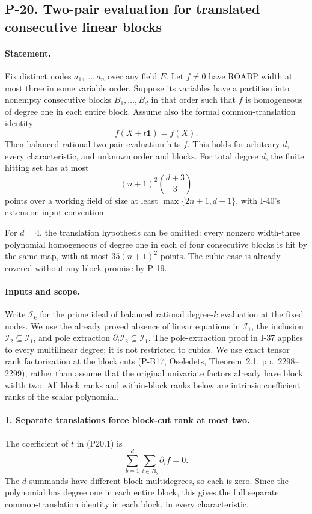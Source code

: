 \subsection{P-20. Two-pair evaluation for translated consecutive linear blocks}
\label{P-20}

\paragraph{Statement.}
Fix distinct nodes $a_1,\ldots,a_n$ over any field $E$.
Let $f\ne0$ have ROABP width at most three in some variable
order. Suppose its variables have a partition into nonempty
consecutive blocks $B_1,\ldots,B_d$ in that order such that
$f$ is homogeneous of degree one in each entire block.
Assume also the formal common-translation identity
\[
                  f(X+t\mathbf1)=f(X).
 \tag{P20.1}
\]
Then balanced rational two-pair evaluation hits $f$. This
holds for arbitrary $d$, every characteristic, and unknown
order and blocks. For total degree $d$, the finite hitting
set has at most
\[
                 (n+1)^2\binom{d+3}{3}
 \tag{P20.2}
\]
points over a working field of size at least
$\max\{2n+1,d+1\}$, with I-40's extension-input convention.

For $d=4$, the translation hypothesis can be omitted:
every nonzero width-three polynomial homogeneous of degree
one in each of four consecutive blocks is hit by the same
map, with at most $35(n+1)^2$ points. The cubic case is
already covered without any block promise by P-19.

\paragraph{Inputs and scope.}
Write $\mathcal I_k$ for the prime ideal of balanced rational
degree-$k$ evaluation at the fixed nodes. We use the already
proved absence of linear equations in $\mathcal I_1$, the
inclusion $\mathcal I_2\subseteq\mathcal I_1$, and pole
extraction $\partial_i\mathcal I_2\subseteq\mathcal I_1$.
The pole-extraction proof in I-37 applies to every multilinear
degree; it is not restricted to cubics. We use exact tensor
rank factorization at the block cuts (P-B17, Oseledets,
Theorem~2.1, pp.~2298--2299), rather than assume that the
original univariate factors already have block width two.
All block ranks and within-block ranks below are intrinsic
coefficient ranks of the scalar polynomial.

\paragraph{1. Separate translations force block-cut rank at most two.}
The coefficient of $t$ in (P20.1) is
\[
                   \sum_{b=1}^d\sum_{i\in B_b}\partial_i f=0.
\]
The $d$ summands have different block multidegrees, so each
is zero. Since the polynomial has degree one in each entire
block, this gives the full separate common-translation
identity in each block, in every characteristic.

